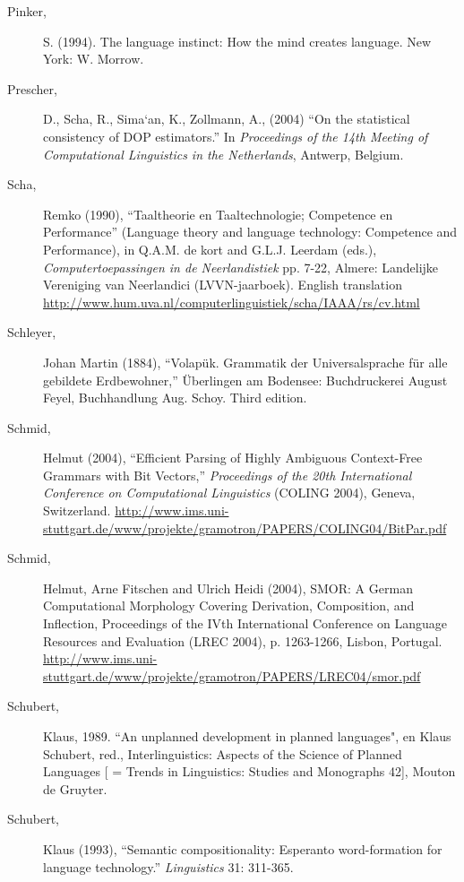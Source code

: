 \documentclass[10pt,a4paper]{article}
\begin{document}
\begin{description}
\item[Pinker,] S. (1994). The language instinct: How the mind creates language. New York: W. Morrow.

\item[Prescher,] D., Scha, R., Sima`an, K., Zollmann, A., (2004) ``On the statistical
consistency of DOP estimators.'' In {\em Proceedings of the 14th Meeting of
Computational Linguistics in the Netherlands}, Antwerp, Belgium.

\item[Scha,] Remko (1990), ``Taaltheorie en Taaltechnologie; Competence en
Performance'' (Language theory and language technology: Competence and
Performance), in Q.A.M. de kort and G.L.J. Leerdam (eds.), {\em
Computertoepassingen in de Neerlandistiek} pp. 7-22, Almere: Landelijke
Vereniging van Neerlandici (LVVN-jaarboek). English translation
\url{http://www.hum.uva.nl/computerlinguistiek/scha/IAAA/rs/cv.html}

\item[Schleyer,] Johan Martin (1884), ``Volap\"uk. Grammatik der Universalsprache f\"ur
alle gebildete Erdbewohner,'' \"Uberlingen am Bodensee: Buchdruckerei August
Feyel, Buchhandlung Aug. Schoy. Third edition.

\item[Schmid,] Helmut (2004), ``Efficient Parsing of Highly Ambiguous Context-Free
Grammars with Bit Vectors,'' {\em Proceedings of the 20th International Conference
on Computational Linguistics} (COLING 2004), Geneva, Switzerland.
\url{http://www.ims.uni-stuttgart.de/www/projekte/gramotron/PAPERS/COLING04/BitPar.pdf}

\item[Schmid,] Helmut, Arne Fitschen and Ulrich Heidi (2004), SMOR: A German
Computational Morphology Covering Derivation, Composition, and Inflection,
Proceedings of the IVth International Conference on Language Resources and
Evaluation (LREC 2004), p. 1263-1266, Lisbon, Portugal.
\url{http://www.ims.uni-stuttgart.de/www/projekte/gramotron/PAPERS/LREC04/smor.pdf}

\item[Schubert,] Klaus, 1989. ``An unplanned development in planned languages",
en Klaus Schubert, red., Interlinguistics: Aspects of the Science of Planned
Languages [ = Trends in Linguistics: Studies and Monographs 42], Mouton de
Gruyter.

\item[Schubert,] Klaus (1993), ``Semantic compositionality: Esperanto
word-formation for language technology.'' {\em Linguistics} 31: 311-365.


\end{description}
\end{document}
